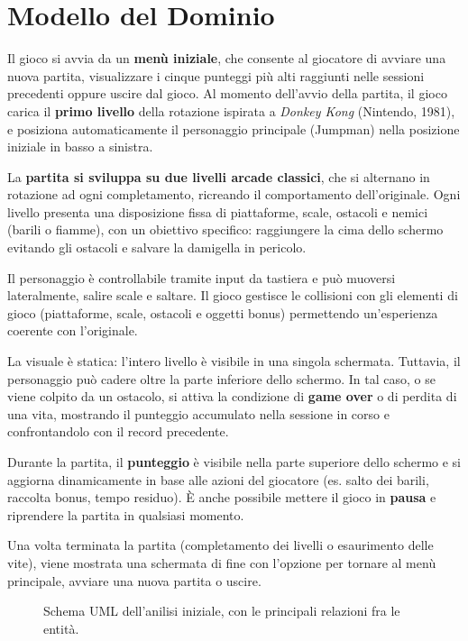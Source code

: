\documentclass[a4paper,12pt]{report}
\begin{document}
\newpage
\section{Modello del Dominio}

Il gioco si avvia da un \textbf{menù iniziale}, che consente al giocatore di avviare una nuova partita, visualizzare i cinque punteggi più alti raggiunti nelle sessioni
precedenti oppure uscire dal gioco. Al momento dell'avvio della partita, il gioco carica il \textbf{primo livello} della rotazione ispirata a \textit{Donkey Kong} (Nintendo, 1981), e
posiziona automaticamente il personaggio principale (Jumpman) nella posizione iniziale in basso a sinistra.

La \textbf{partita si sviluppa su due livelli arcade classici}, che si alternano in rotazione ad ogni completamento, ricreando il comportamento dell'originale. Ogni livello
presenta una disposizione fissa di piattaforme, scale, ostacoli e nemici (barili o fiamme), con un obiettivo specifico: raggiungere la cima dello schermo evitando gli ostacoli e
salvare la damigella in pericolo.

Il personaggio è controllabile tramite input da tastiera e può muoversi lateralmente, salire scale e saltare. Il gioco gestisce le collisioni con gli elementi di
gioco (piattaforme, scale, ostacoli e oggetti bonus) permettendo un'esperienza coerente con l'originale.

La visuale è statica: l'intero livello è visibile in una singola schermata. Tuttavia, il personaggio può cadere oltre la parte inferiore dello schermo. In tal caso,
o se viene colpito da un ostacolo, si attiva la condizione di \textbf{game over} o di perdita di una vita, mostrando il punteggio accumulato nella sessione
in corso e confrontandolo con il record precedente.

Durante la partita, il \textbf{punteggio} è visibile nella parte superiore dello schermo e si aggiorna dinamicamente in base alle azioni
del giocatore (es. salto dei barili, raccolta bonus, tempo residuo). È anche possibile mettere il gioco in \textbf{pausa} e riprendere la partita in qualsiasi momento.

Una volta terminata la partita (completamento dei livelli o esaurimento delle vite), viene mostrata una schermata di fine con l'opzione per
tornare al menù principale, avviare una nuova partita o uscire.
\begin{figure}[H]
	\centering{}
	
	\caption{Schema UML dell'anilisi iniziale, con le principali relazioni fra le entità.}
	\label{img:model}
\end{figure}
\end{document}
